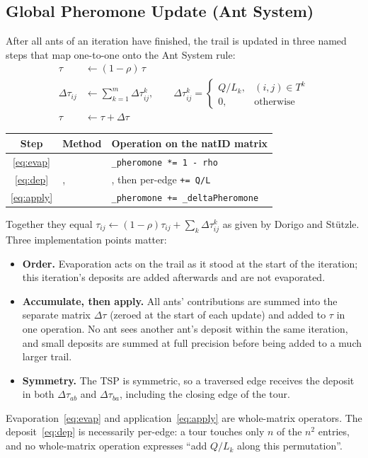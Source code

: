\documentclass[11pt,a4paper]{article}
\begin{document}
\subsection{Global Pheromone Update (Ant System)}
After all ants of an iteration have finished, the trail is updated in three named steps that map
one-to-one onto the Ant System rule:
\begin{align}
\tau &\leftarrow (1-\rho)\,\tau \label{eq:evap}\\
\Delta\tau_{ij} &\leftarrow \sum_{k=1}^{m}\Delta\tau_{ij}^k,\qquad
\Delta\tau_{ij}^k=\begin{cases}Q/L_k,&(i,j)\in T^k\\0,&\text{otherwise}\end{cases} \label{eq:dep}\\
\tau &\leftarrow \tau+\Delta\tau \label{eq:apply}
\end{align}
\begin{center}
\begin{tabularx}{\linewidth}{@{}c p{5.2cm} L@{}}
\toprule
\textbf{Step} & \textbf{Method} & \textbf{Operation on the natID matrix} \\
\midrule
\eqref{eq:evap} &  & \texttt{\_pheromone *= 1 - rho} \\
\eqref{eq:dep} & ,  & , then per-edge \texttt{+= Q/L} \\
\eqref{eq:apply} &  & \texttt{\_pheromone += \_deltaPheromone} \\
\bottomrule
\end{tabularx}
\end{center}
Together they equal $\tau_{ij}\leftarrow(1-\rho)\tau_{ij}+\sum_k\Delta\tau_{ij}^k$ as given by Dorigo and
Stützle. Three implementation points matter:
\begin{itemize}
  \item \textbf{Order.} Evaporation acts on the trail as it stood at the start of the iteration; this
        iteration's deposits are added afterwards and are not evaporated.
  \item \textbf{Accumulate, then apply.} All ants' contributions are summed into the separate matrix
        $\Delta\tau$ (zeroed at the start of each update) and added to $\tau$ in one operation. No ant sees
        another ant's deposit within the same iteration, and small deposits are summed at full precision
        before being added to a much larger trail.
  \item \textbf{Symmetry.} The TSP is symmetric, so a traversed edge receives the deposit in both
        $\Delta\tau_{ab}$ and $\Delta\tau_{ba}$, including the closing edge of the tour.
\end{itemize}
Evaporation~\eqref{eq:evap} and application~\eqref{eq:apply} are whole-matrix 
operators. The deposit~\eqref{eq:dep} is necessarily per-edge: a tour touches only $n$ of the $n^2$
entries, and no whole-matrix operation expresses ``add $Q/L_k$ along this permutation''.
\end{document}
